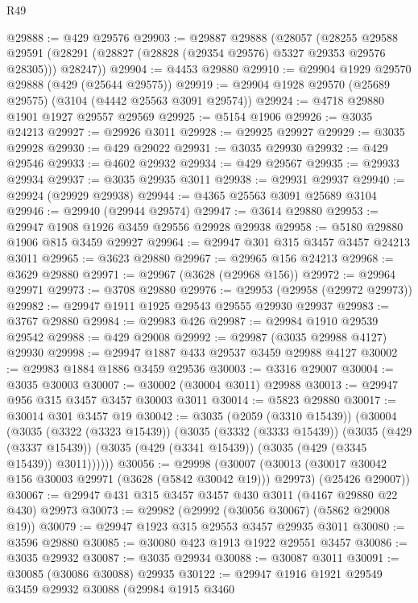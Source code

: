 \begin{lexlean}{R49}
\begin{coremodule}
@29888 := @429 @29576
@29903 := @29887
    @29888
    (@28057
      (@28255
        @29588
        @29591
        (@28291 (@28827 (@28828 (@29354 @29576) @5327 @29353 @29576 @28305)))
        @28247))
@29904 := @4453 @29880
@29910 := @29904 @1929 @29570 @29888 (@429 (@25644 @29575))
@29919 := @29904 @1928 @29570 (@25689 @29575) (@3104 (@4442 @25563 @3091 @29574))
@29924 := @4718 @29880 @1901 @1927 @29557 @29569
@29925 := @5154 @1906
@29926 := @3035 @24213
@29927 := @29926 @3011
@29928 := @29925 @29927
@29929 := @3035 @29928
@29930 := @429 @29022
@29931 := @3035 @29930
@29932 := @429 @29546
@29933 := @4602 @29932
@29934 := @429 @29567
@29935 := @29933 @29934
@29937 := @3035 @29935 @3011
@29938 := @29931 @29937
@29940 := @29924 (@29929 @29938)
@29944 := @4365 @25563 @3091 @25689 @3104
@29946 := @29940 (@29944 @29574)
@29947 := @3614 @29880
@29953 := @29947 @1908 @1926 @3459 @29556 @29928 @29938
@29958 := @5180 @29880 @1906 @815 @3459 @29927
@29964 := @29947 @301 @315 @3457 @3457 @24213 @3011
@29965 := @3623 @29880
@29967 := @29965 @156 @24213
@29968 := @3629 @29880
@29971 := @29967 (@3628 (@29968 @156))
@29972 := @29964 @29971
@29973 := @3708 @29880
@29976 := @29953 (@29958 (@29972 @29973))
@29982 := @29947 @1911 @1925 @29543 @29555 @29930 @29937
@29983 := @3767 @29880
@29984 := @29983 @426
@29987 := @29984 @1910 @29539 @29542
@29988 := @429 @29008
@29992 := @29987 (@3035 @29988 @4127) @29930
@29998 := @29947 @1887 @433 @29537 @3459 @29988 @4127
@30002 := @29983 @1884 @1886 @3459 @29536
@30003 := @3316 @29007
@30004 := @3035 @30003
@30007 := @30002 (@30004 @3011) @29988
@30013 := @29947 @956 @315 @3457 @3457 @30003 @3011
@30014 := @5823 @29880
@30017 := @30014 @301 @3457 @19
@30042 := @3035
    (@2059 (@3310 @15439))
    (@30004
      (@3035
        (@3322 (@3323 @15439))
        (@3035
          (@3332 (@3333 @15439))
          (@3035
            (@429 (@3337 @15439))
            (@3035 (@429 (@3341 @15439)) (@3035 (@429 (@3345 @15439)) @3011))))))
@30056 := @29998
    (@30007
      (@30013 (@30017 @30042 @156 @30003 @29971 (@3628 (@5842 @30042 @19))) @29973)
      (@25426 @29007))
@30067 := @29947 @431 @315 @3457 @3457 @430 @3011 (@4167 @29880 @22 @430) @29973
@30073 := @29982 (@29992 (@30056 @30067) (@5862 @29008 @19))
@30079 := @29947 @1923 @315 @29553 @3457 @29935 @3011
@30080 := @3596 @29880
@30085 := @30080 @423 @1913 @1922 @29551 @3457
@30086 := @3035 @29932
@30087 := @3035 @29934
@30088 := @30087 @3011
@30091 := @30085 (@30086 @30088) @29935
@30122 := @29947
    @1916
    @1921
    @29549
    @3459
    @29932
    @30088
    (@29984
      @1915
      @3460

\end{coremodule}
\end{lexlean}

